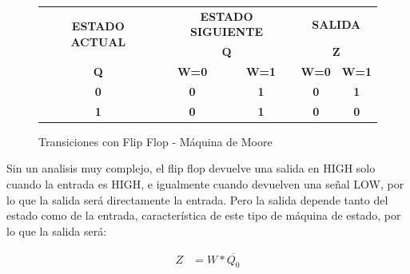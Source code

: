 \documentclass[10pt,a4paper]{article}
\begin{document}
\begin{figure}[H]
	\begin{center}
		\begin{tabular}{|c|c|c|c|c|}
\hline
\multirow{2}{*}{\textbf{ESTADO ACTUAL}} & \multicolumn{2}{c|}{\textbf{ESTADO SIGUIENTE}} & \multicolumn{2}{c|}{\textbf{SALIDA}} \\ \cline{2-5} 
 & \multicolumn{2}{c|}{\textbf{Q}} & \multicolumn{2}{c|}{\textbf{Z}} \\ \hline
\textbf{Q} & \textbf{W=0} & \textbf{W=1} & \textbf{W=0} & \textbf{W=1} \\ \hline
\textbf{0} & \textbf{0} & \textbf{1} & \textbf{0} & \textbf{1} \\ \hline
\textbf{1} & \textbf{0} & \textbf{1} & \textbf{0} & \textbf{0} \\ \hline
		\end{tabular}
		\caption{Transiciones con Flip Flop - Máquina de Moore} 
		\label{3_fig8}
	\end{center}
\end{figure}

Sin un analisis muy complejo, el flip flop devuelve una salida en HIGH solo cuando la entrada es HIGH, e igualmente cuando devuelven una señal LOW, por lo que la salida será directamente la entrada. Pero la salida depende tanto del estado como de la entrada, característica de este tipo de máquina de estado, por lo que la salida será:

\begin{align*}
	Z &= W * \overline{Q_{0}} \\
\end{align*}
\end{document}
